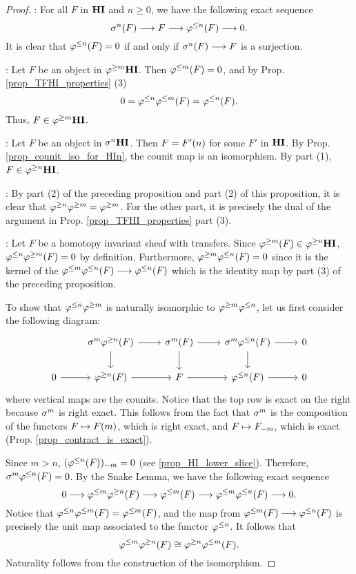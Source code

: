 \begin{proof}
 : For all $F$ in $\HI$ and $n \geq 0$, we have the 
following exact sequence
\[
\sgHI{n}(F) \to F \to \tlHI{n}(F) \to 0.
\]
It is clear that $\tlHI{n}(F) = 0$ if and only if $\sgHI{n}(F) 
\to F$ is a surjection.

 : Let $F$ be an object in $\THI{m}$. Then 
$\tlHI{m}(F) = 0$, and by Prop. \ref{prop_TFHI_properties} (3)
\[
0 = \tlHI{n}\tlHI{m}(F) = \tlHI{n}(F).
\]
Thus, $F \in \THI{m}$.

 : Let $F$ be an object in $\sgHI{n} \HI$. Then $F = 
\LHI[n]{F'}$ for some $F'$ in $\HI$. By Prop. 
\ref{prop_counit_iso_for_HIn}, the counit map is an isomorphism. 
By part (1), $F \in \THI{n}$.

 : By part (2) of the preceding proposition and part 
(2) of this proposition, it is clear that $\tgHI{n} \tgHI{m} = 
\tgHI{m}$. For the other part, it is precisely the dual of the 
argument in Prop. \ref{prop_TFHI_properties} part (3).

 : Let $F$ be a homotopy invariant sheaf with 
transfers. Since $\tgHI{m}(F) \in \THI{n}$, $\tlHI{n} \tgHI{m}(F) 
= 0$ by definition. Furthermore, $\tgHI{m}\tlHI{n}(F) = 0$ since 
it is the kernel of the $\tlHI{m} \tlHI{n}(F) \to \tlHI{n}(F)$ 
which is the identity map by part (3) of the preceding 
proposition.

To show that $\tlHI{n} \tgHI{m}$ is naturally isomorphic to
$\tgHI{m} \tlHI{n}$, let us first consider the following 
diagram:
\[
\begin{tikzcd}
{} &
\sgHI{m} \tgHI{n}(F) \arrow{r} \arrow{d} &
\sgHI{m}(F) \arrow{r} \arrow{d} &
\sgHI{m} \tlHI{n}(F) \arrow{r} \arrow{d} &
0 \\
0 \arrow{r} &
\tgHI{n}(F) \arrow{r} &
F \arrow{r} &
\tlHI{n}(F) \arrow{r}&
0
\end{tikzcd}
\]
where vertical maps are the counits. Notice that the top row is 
exact on the right because $\sgHI{m}$ is right exact. This follows 
from the fact that $\sgHI{m}$ is the composition of the functors 
$F \mapsto \LHI[m]{F}$, which is right exact, and $F \mapsto 
\RHI[m]{F}$, which is exact (Prop. \ref{prop_contract_is_exact}).

Since $m > n$, $\RHI[m]{(\tlHI{n}(F))} = 0$ (see 
\ref{prop_HI_lower_slice}). Therefore, $\sgHI{m}\tlHI{n}(F) = 0$. 
By the Snake Lemma, we have the following exact sequence
\[
0 \to \tlHI{m}\tgHI{n}(F) \to \tlHI{m}(F) \to \tlHI{m} \tlHI{n}(F) 
   \to 0.
\]
Notice that $\tlHI{n} \tlHI{m}(F) = \tlHI{m}(F)$, and the map from
$\tlHI{m}(F) \to \tlHI{n}(F)$ is precisely the unit map associated
to the functor $\tlHI{n}$. It follows that
\[
\tlHI{m} \tgHI{n}(F) \cong \tgHI{n} \tlHI{m}(F).
\]
Naturality follows from the construction of the isomorphism.
\end{proof}

